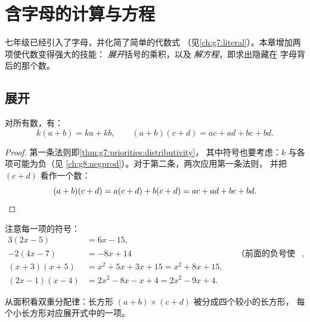 \chapter{含字母的计算与方程}\label{ch:g8:equations}

七年级已经引入了字母，并化简了简单的代数式
（见\cref{ch:g7:literal}）。本章增加两项使代数变得强大的技能：
\emph{展开}括号的乘积，以及
\emph{解方程}，即求出隐藏在
字母背后的那个数。

\section{展开}

\begin{theorem}[单分配律与双分配律]\label{thm:g8:equations:expand}
对所有数，有：
\[
k(a + b) = ka + kb,
\qquad
(a + b)(c + d) = ac + ad + bc + bd .
\]
\end{theorem}

\begin{proof}
第一条法则即\cref{thm:g7:priorities:distributivity}，
其中符号也要考虑：$k$ 与各项可能为负（见
\cref{ch:g8:negprod}）。对于第二条，两次应用第一条法则，
并把 $(c + d)$ 看作一个数：
\[
(a + b)(c + d) = a(c + d) + b(c + d) = ac + ad + bc + bd .
\qedhere
\]
\end{proof}

\begin{example}\label{ex:g8:equations:expand}
注意每一项的符号：
\begin{align*}
3(2x - 5) &= 6x - 15, \\
-2(4x - 7) &= -8x + 14
&& \text{（前面的负号使两项的符号都改变）}, \\
(x + 3)(x + 5) &= x^2 + 5x + 3x + 15 = x^2 + 8x + 15, \\
(2x - 1)(x - 4) &= 2x^2 - 8x - x + 4 = 2x^2 - 9x + 4 .
\end{align*}
\end{example}

\begin{omfigure}

{\small 从面积看双重分配律：长方形
$(a+b) \times (c+d)$ 被分成四个较小的长方形，
每个小长方形对应展开式中的一项。}
\end{omfigure}

